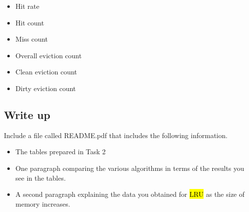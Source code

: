 \documentclass[12pt]{article}
\begin{document}
\bigskip

\begin{itemize}
    \item Hit rate
    \item Hit count
    \item Miss count
    \item Overall eviction count
    \item Clean eviction count
    \item Dirty eviction count
\end{itemize}


\subsection{Write up}

\noindent Include a file called README.pdf that includes the following information.

\begin{itemize}
    \item The tables prepared in Task 2
    \item One paragraph comparing the various algorithms in terms of the results
    you see in the tables.
    \item A second paragraph explaining the data you obtained for \hl{LRU} as the size
    of memory increases.
\end{itemize}
\end{document}
